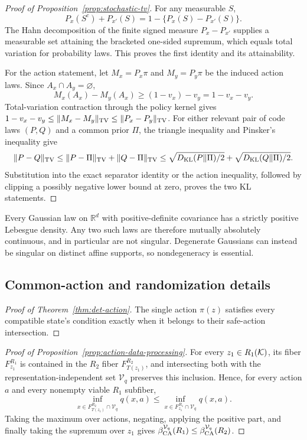 \begin{proof}[Proof of Proposition~\ref{prop:stochastic-tv}]
For any measurable $S$,
\[
 P_x(S^c)+P_{x'}(S)=1-\{P_x(S)-P_{x'}(S)\}.
\]
The Hahn decomposition of the finite signed measure $P_x-P_{x'}$ supplies a measurable set
attaining the bracketed one-sided supremum, which equals total variation for probability laws.
This proves the first identity and its attainability.

For the action statement, let $M_x=P_x\pi$ and $M_y=P_y\pi$ be the induced action laws.  Since
$A_x\cap A_y=\varnothing$,
\[
 M_x(A_x)-M_y(A_x)\geq(1-v_x)-v_y=1-v_x-v_y.
\]
Total-variation contraction through the policy kernel gives
$1-v_x-v_y\leq\|M_x-M_y\|_{\rm TV}\leq\|P_x-P_y\|_{\rm TV}$.
For either relevant pair of code laws $(P,Q)$ and a common prior $\Pi$, the triangle inequality
and Pinsker's inequality give
\[
 \|P-Q\|_{\rm TV}
 \leq\|P-\Pi\|_{\rm TV}+\|Q-\Pi\|_{\rm TV}
 \leq\sqrt{D_{\rm KL}(P\|\Pi)/2}+\sqrt{D_{\rm KL}(Q\|\Pi)/2}.
\]
Substitution into the exact separator identity or the action inequality, followed by clipping a
possibly negative lower bound at zero, proves the two KL statements.
\end{proof}

Every Gaussian law on $\mathbb R^d$ with positive-definite covariance has a strictly positive
Lebesgue density.  Any two such laws are therefore mutually absolutely continuous, and in
particular are not singular.  Degenerate Gaussians can instead be singular on distinct affine
supports, so nondegeneracy is essential.

\subsection{Common-action and randomization details}\label{sec:action-proofs}

\begin{proof}[Proof of Theorem~\ref{thm:det-action}]
The single action $\pi(z)$ satisfies every compatible state's condition exactly when it belongs to
their safe-action intersection.
\end{proof}

\begin{proof}[Proof of Proposition~\ref{prop:action-data-processing}]
For every $z_1\in R_1(\mathcal{K})$, its fiber $F_{z_1}^{R_1}$ is contained in the
$R_2$ fiber $F_{T(z_1)}^{R_2}$, and intersecting both with the representation-independent set
$\mathcal V_q$ preserves this inclusion.  Hence, for every action $a$ and every nonempty viable
$R_1$ subfiber,
\[
 \inf_{x\in F_{T(z_1)}^{R_2}\cap\mathcal V_q}q(x,a)
 \leq
 \inf_{x\in F_{z_1}^{R_1}\cap\mathcal V_q}q(x,a).
\]
Taking the maximum over actions, negating, applying the positive part, and finally taking the
supremum over $z_1$ gives
$\beta_{\rm CA}^{\mathcal V_q}(R_1)\leq\beta_{\rm CA}^{\mathcal V_q}(R_2)$.
\end{proof}

